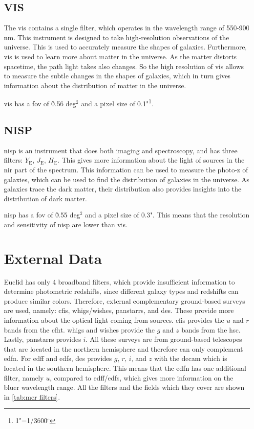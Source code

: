 \subsection{VIS}
The \gls{vis} contains a single filter, which operates in the wavelength range of 550-900 nm. This instrument is designed to take high-resolution observations of the universe. This is used to accurately measure the shapes of galaxies. Furthermore, \gls{vis} is used to learn more about matter in the universe. As the matter distorts spacetime, the path light takes also changes. So the high resolution of \gls{vis} allows to measure the subtle changes in the shapes of galaxies, which in turn gives information about the distribution of matter in the universe.

\gls{vis} has a \gls{fov} of \~ 0.56 deg$^2$ and a pixel size of 0.1"\footnote{1"=1/3600$^\circ$}. 

\subsection{NISP}
\gls{nisp} is an instrument that does both imaging and spectroscopy, and has three filters: $Y_\mathrm{E}$, $J_\mathrm{E}$, $H_\mathrm{E}$. This gives more information about the light of sources in the \gls{nir} part of the spectrum. This information can be used to measure the photo-z of galaxies, which can be used to find the distribution of galaxies in the universe. As galaxies trace the dark matter, their distribution also provides insights into the distribution of dark matter. 

\gls{nisp} has a \gls{fov} of \~0.55 deg$^2$ and a pixel size of 0.3". This means that the resolution and sensitivity of \gls{nisp} are lower than \gls{vis}.

\section{External Data}

Euclid has only 4 broadband filters, which provide insufficient information to determine photometric redshifts, since different galaxy types and redshifts can produce similar colors. Therefore, external complementary ground-based surveys are used, namely: \gls{cfis}, \gls{whigs}/\gls{wishes}, \gls{panstarrs}, and \gls{des}. These provide more information about the optical light coming from sources. \gls{cfis} provides the $u$ and $r$ bands from the \gls{cfht}. \gls{whigs} and \gls{wishes} provide the $g$ and $z$ bands from the \gls{hsc}. Lastly, \gls{panstarrs} provides $i$.  All these surveys are from ground-based telescopes that are located in the northern hemisphere and therefore can only complement \gls{edfn}. For \gls{edff} and \gls{edfs}, \gls{des} provides $g$, $r$, $i$, and $z$ with the \gls{decam} which is located in the southern hemisphere. This means that the \gls{edfn} has one additional filter, namely $u$, compared to \gls{edff}/\gls{edfs}, which gives more information on the bluer wavelength range. All the filters and the fields which they cover are shown in \autoref{tab:mer filters}.


